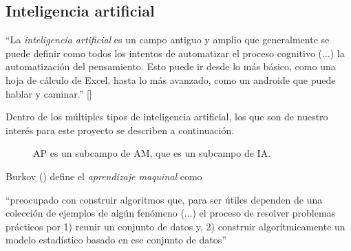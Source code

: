 \subsection {Inteligencia artificial}\label{subsec:intela}
\begin{displayquote}
``La \emph{inteligencia artificial} es un campo antiguo y amplio que generalmente se puede definir como todos los intentos de automatizar el proceso cognitivo (...) la automatización del pensamiento. Esto puede ir desde lo más básico, como una hoja de cálculo de Excel, hasta lo más avanzado, como un androide que puede hablar y caminar.'' [\cite{cho18}]
\end{displayquote}

Dentro de los múltiples tipos de inteligencia artificial, los que son de nuestro interés para este proyecto se describen a continuación.

\begin{wrapfigure}[11]{r}[0cm]{2.66cm}
	\caption[Inteligencia artificial]{AP es un subcampo de AM, que es un subcampo de IA.}\label{FIG:IA}
\end{wrapfigure}
Burkov (\citeyear{burk19}) define el \emph{aprendizaje maquinal} como
\begin{displayquote}
``preocupado con construir algoritmos que, para ser útiles dependen de una colección de ejemplos de algún fenómeno (...) el proceso de resolver problemas prácticos por 1) reunir un conjunto de datos y, 2) construir algorítmicamente un modelo estadístico basado en ese conjunto de datos''
\end{displayquote}


